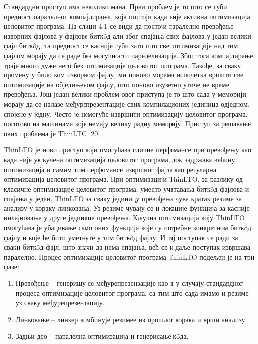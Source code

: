 \documentclass[12pt,oneside]{memoir}
\begin{document}
Стандардни приступ има неколико мана.
Први проблем је то што се губи предност паралелног компајлирања, која постоји 
када није активна оптимизација целовитог програма.
На слици 4.1 се види да постоји паралелно превођење изворних фајлова у 
фајлове битк\^{o}д али због спајања свих фајлова у један велики фајл битк\^{o}д,
та предност се касније губи зато што све оптимизације над тим фајлом морају 
да се раде без могућности парелелизације.
Због тога компајлирање траје много дуже него без оптимизације целовитог програма.
Такође, за сваку промену у било ком изворном фајлу, ми поново морамо испочетка
вршити све оптимизације на обједињеном фајлу, што поново изузетно утиче не време
превођења.
Још један велики проблем овог приступа је то што сада у меморији морају да се налазе  међурепрезентације свих компилационих јединица одједном, спојене
у једну. 
Често је немогуће извршити оптимизацију целовитог програма, поготово на 
машинама које немају велику радну меморију.
Приступ за решавање ових проблема је  ThinLTO [20].
\par ThinLTO је нови приступ који омогућава сличне перфомансе при превођењу
као када није укључена оптимизација целовитог програма, док задржава већину
оптимизација и самим тим перфомансе извршног фајла као регуларна оптимизација
целовитог програма.
При оптимизацији ThinLTO, за разлику од класичне оптимизације целовитог програма, уместо учитавања битк\^{o}д фајлова и спајања у један,
ThinLTO за сваку јединицу превођења чува кратак
резиме за анализу у кораку линковања. 
Уз резиме чувају се и локације функција за касније инлајновање у друге јединице 
превођења.
Кључна оптимизација коју ThinLTO омогућава је убацивање само оних функција које
су потребне конкретном битк\^{o}д фајлу и које ће бити уметнуте у том  битк\^{o}д фајлу.
И тај поступак се ради за сваки  битк\^{o}д фајл, што значи да нема спајања, већ се и
даље поступак  извршава паралелно.
Процес оптимизације целовитог програма ThinLTO подељен је на три фазе:
\begin{enumerate}
\item Превођење -- генеришу се међурепрезензације као и у случају стандардног процеса
	оптимизације целовитог програма, са тим што сада имамо и резиме уз сваку
	међурепрезентацију.
\item Линковање -- линкер комбинује резимее из прошлог корака и врши анализу.
\item Задњи део -- паралелна оптимизација и генерисање к\^{o}да.
\end{enumerate}
 
\end{document}
